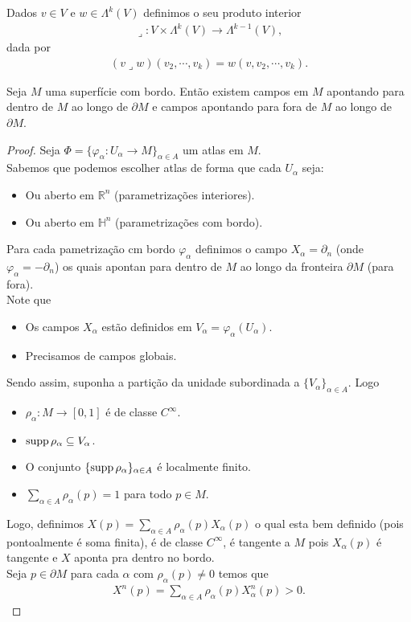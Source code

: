 \begin{definition}
  Dados $v\in V$ e $w\in\Lambda^{k}(V)$ definimos o seu produto interior
  \begin{align*}
    \lrcorner:V\times\Lambda^{k}(V)\to\Lambda^{k-1}(V),
  \end{align*}
  dada por
  \begin{align*}
    (v\lrcorner w)(v_2,\cdots,v_k)=w(v,v_2,\cdots,v_k).
  \end{align*}
\end{definition}
\begin{proposition}
  Seja $M$ uma superfície com bordo. Então existem campos em $M$ apontando para dentro de $M$ ao longo de $\partial M$ e campos apontando para fora de $M$ ao longo de $\partial M$. 
\end{proposition}
\begin{proof} 
  Seja $\Phi=\{\varphi_\alpha:U_\alpha\to M\}_{\alpha\in A}$ um atlas em $M$.\\
  Sabemos que podemos escolher atlas de forma que cada $U_\alpha$ seja:
  \begin{itemize}
    \item Ou aberto em $\mathbb{R}^{n}$ (parametrizações interiores). 
    \item Ou aberto em $\mathbb{H}^{n}$ (parametrizações com bordo). 
  \end{itemize}
  Para cada pametrização cm bordo $\varphi_\alpha$ definimos o campo $X_\alpha=\partial_n$ (onde $\varphi_\alpha=-\partial_n$) os quais apontan para dentro de $M$ ao longo da fronteira $\partial M$ (para fora).\\
  Note que
  \begin{itemize}
    \item Os campos $X_\alpha$ estão definidos em $V_\alpha=\varphi_\alpha(U_\alpha)$.
    \item Precisamos de campos globais.
  \end{itemize}
  Sendo assim, suponha a partição da unidade subordinada a $\{V_\alpha\}_{\alpha\in A}$. Logo
  \begin{itemize}
    \item $\rho_\alpha:M\to[0,1]$ é de classe $C^{\infty}$.
    \item $\operatorname{supp}\rho_\alpha\subseteq V_\alpha$.
    \item O conjunto $\{\operatorname{supp}\rho_\alpha\}_{\alpha\in A}$ é localmente finito.
    \item $\sum_{\alpha\in A}\rho_{\alpha}(p)=1$ para todo $p\in M$. 
  \end{itemize}
  Logo, definimos $X(p)=\sum_{\alpha\in A}\rho_{\alpha}(p)X_{\alpha}(p)$ o qual esta bem definido (pois pontoalmente é soma finita), é de classe $C^{\infty}$, é tangente a $M$ pois $X_\alpha(p)$ é tangente e $X$ aponta pra dentro no bordo.\\
  Seja $p\in\partial M$ para cada $\alpha$ com $\rho_{\alpha}(p)\neq 0$ temos que
  \begin{align*}
    X^{n}(p)=\sum_{\alpha\in A}\rho_\alpha(p)X^{n}_\alpha(p)>0.
  \end{align*}
\end{proof}

